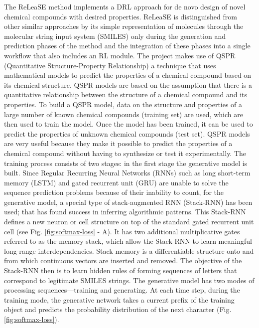 \documentclass[a4paper]{article}
\begin{document}
The ReLeaSE method implements a DRL approach for de novo design of novel chemical compounds with desired properties. ReLeaSE is distinguished from other similar approaches by its simple representation of molecules through the molecular string input system (SMILES) only during the generation and prediction phases of the method and the integration of these phases into a single workflow that also includes an RL module. 
The project makes use of QSPR (Quantitative Structure-Property Relationship) a technique that uses mathematical models to predict the properties of a chemical compound based on its chemical structure. QSPR models are based on the assumption that there is a quantitative relationship between the structure of a chemical compound and its properties. To build a QSPR model, data on the structure and properties of a large number of known chemical compounds (training set) are used, which are then used to train the model. Once the model has been trained, it can be used to predict the properties of unknown chemical compounds (test set). QSPR models are very useful because they make it possible to predict the properties of a chemical compound without having to synthesize or test it experimentally.
The training process consists of two stages: in the first stage the generative model is built.
Since Regular Recurring Neural Networks (RNNs) such as long short-term memory (LSTM) \cite{lstm} and gated recurrent unit (GRU) \cite{gru} are unable to solve the sequence prediction problems because of their inability to count, for the generative model, a special type of stack-augmented RNN (Stack-RNN) \cite{stack-rnn} has been used; that has found success in inferring algorithmic patterns. This Stack-RNN defines a new neuron or cell structure on top of the standard gated recurrent unit \cite{grnn} cell (see Fig. \ref{fig:softmax-loss} - A). It has two additional multiplicative gates referred to as the memory stack, which allow the Stack-RNN to learn meaningful long-range interdependencies. Stack memory is a differentiable structure onto and from which continuous vectors are inserted and removed. The objective of the Stack-RNN then is to learn hidden rules of forming sequences of letters that correspond to legitimate SMILES strings.
The generative model has two modes of processing sequences—training and generating.  
At each time step, during the training mode, the generative network takes a current prefix of the training object and predicts the probability distribution of the next character (Fig. \ref{fig:softmax-loss}). 
\end{document}
